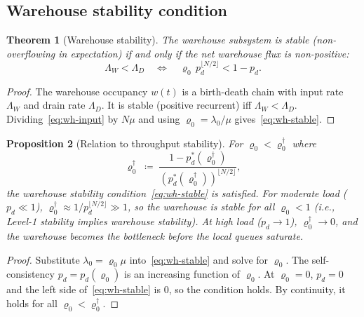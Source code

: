 \documentclass[11pt,a4paper]{article}
\newtheorem{theorem}{Theorem}[section]
\newtheorem{proposition}[theorem]{Proposition}
\newcommand{\rhozero}{\varrho_0}
\newcommand{\lambdazero}{\lambda_0}
\newcommand{\pd}{p_d}
\begin{document}
\subsection{Warehouse stability condition}

\begin{theorem}[Warehouse stability]
\label{thm:wh-stable}
The warehouse subsystem is stable (non-overflowing in expectation) if and
only if the net warehouse flux is non-positive:
\begin{equation}
  \Lambda_W < \Lambda_D
  \quad\Longleftrightarrow\quad
  \rhozero\,\pd^{\lfloor N/2\rfloor} < 1 - \pd.
  \label{eq:wh-stable}
\end{equation}
\end{theorem}

\begin{proof}
The warehouse occupancy $w(t)$ is a birth-death chain with input rate
$\Lambda_W$ and drain rate $\Lambda_D$.
It is stable (positive recurrent) iff $\Lambda_W < \Lambda_D$.
Dividing~\eqref{eq:wh-input} by $N\mu$ and using $\rhozero = \lambdazero/\mu$
gives~\eqref{eq:wh-stable}.
\end{proof}

\begin{proposition}[Relation to throughput stability]
\label{prop:l1-implies-wh}
For $\rhozero < \rhozero^{\dagger}$ where
\begin{equation}
  \rhozero^{\dagger}
  \;\coloneqq\;
  \frac{1-\pd^*(\rhozero^{\dagger})}{(\pd^*(\rhozero^{\dagger}))^{\lfloor N/2\rfloor}},
  \label{eq:rho-dagger}
\end{equation}
the warehouse stability condition~\eqref{eq:wh-stable} is satisfied.
For moderate load ($\pd \ll 1$), $\rhozero^{\dagger} \approx 1/\pd^{\lfloor N/2\rfloor} \gg 1$,
so the warehouse is stable for all $\rhozero < 1$ (i.e., Level-1 stability
implies warehouse stability).
At high load ($\pd \to 1$), $\rhozero^{\dagger} \to 0$, and the warehouse
becomes the bottleneck before the local queues saturate.
\end{proposition}

\begin{proof}
Substitute $\lambdazero = \rhozero\mu$ into~\eqref{eq:wh-stable} and
solve for $\rhozero$.  The self-consistency $\pd = \pd(\rhozero)$ is an
increasing function of $\rhozero$.  At $\rhozero = 0$, $\pd = 0$ and
the left side of~\eqref{eq:wh-stable} is 0, so the condition holds.
By continuity, it holds for all $\rhozero < \rhozero^\dagger$.
\end{proof}
\end{document}
